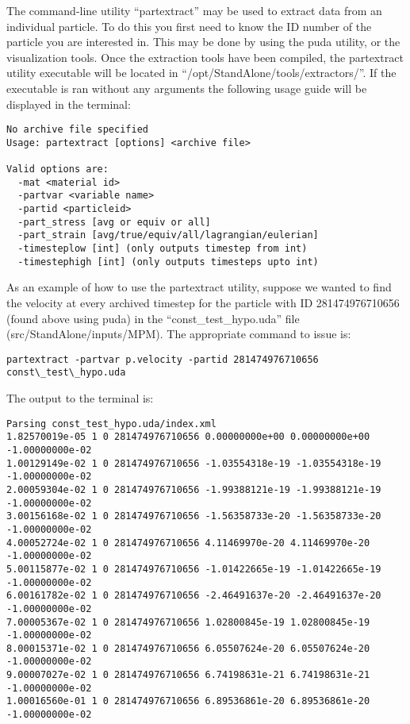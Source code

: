 The command-line utility ``partextract'' may be used to extract data from an individual particle.  To do this you first need to know the ID number of the particle you are interested in.  This may be done by using the puda utility, or the visualization tools.  Once the extraction tools have been compiled, the partextract utility executable will be located in  ``/opt/StandAlone/tools/extractors/''.  If the executable is ran without any arguments the following usage guide will be displayed in the terminal:

\begin{verbatim}
No archive file specified
Usage: partextract [options] <archive file>

Valid options are:
  -mat <material id>
  -partvar <variable name>
  -partid <particleid>
  -part_stress [avg or equiv or all]
  -part_strain [avg/true/equiv/all/lagrangian/eulerian]
  -timesteplow [int] (only outputs timestep from int)
  -timestephigh [int] (only outputs timesteps upto int)
\end{verbatim}

As an example of how to use the partextract utility, suppose we wanted to find the velocity at every archived timestep for the particle with ID 281474976710656 (found above using puda) in the ``const\_test\_hypo.uda'' file (src/StandAlone/inputs/MPM).  The appropriate command to issue is:

\begin{verbatim}
partextract -partvar p.velocity -partid 281474976710656 const\_test\_hypo.uda
\end{verbatim}

The output to the terminal is:

\begin{verbatim}
Parsing const_test_hypo.uda/index.xml
1.82570019e-05 1 0 281474976710656 0.00000000e+00 0.00000000e+00 -1.00000000e-02
1.00129149e-02 1 0 281474976710656 -1.03554318e-19 -1.03554318e-19 -1.00000000e-02
2.00059304e-02 1 0 281474976710656 -1.99388121e-19 -1.99388121e-19 -1.00000000e-02
3.00156168e-02 1 0 281474976710656 -1.56358733e-20 -1.56358733e-20 -1.00000000e-02
4.00052724e-02 1 0 281474976710656 4.11469970e-20 4.11469970e-20 -1.00000000e-02
5.00115877e-02 1 0 281474976710656 -1.01422665e-19 -1.01422665e-19 -1.00000000e-02
6.00161782e-02 1 0 281474976710656 -2.46491637e-20 -2.46491637e-20 -1.00000000e-02
7.00005367e-02 1 0 281474976710656 1.02800845e-19 1.02800845e-19 -1.00000000e-02
8.00015371e-02 1 0 281474976710656 6.05507624e-20 6.05507624e-20 -1.00000000e-02
9.00007027e-02 1 0 281474976710656 6.74198631e-21 6.74198631e-21 -1.00000000e-02
1.00016560e-01 1 0 281474976710656 6.89536861e-20 6.89536861e-20 -1.00000000e-02
\end{verbatim}

